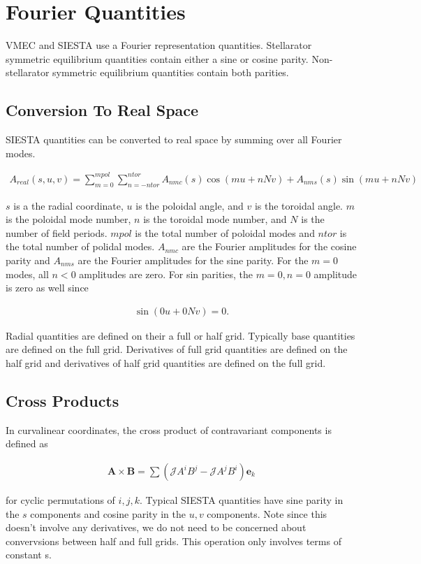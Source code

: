 \documentclass[11pt]{article}
\newcommand{\brackets}[1]{\left(#1\right)}
\renewcommand{\vec}[1]{\boldsymbol#1}
\newcommand{\co}[1]{\vec{e}_{#1}}
\newcommand{\equ}[2]{
	\begin{equation}
    \begin{split}
	#1
	\label{#2}
	\end{split}
	\end{equation}
}
\newcommand{\crossp}[2]{#1\times#2}
\begin{document}
\section{Fourier Quantities}
VMEC and SIESTA use a Fourier representation quantities.
Stellarator symmetric equilibrium quantities contain either a sine or cosine parity.
Non-stellarator symmetric equilibrium quantities contain both parities.

\subsection{Conversion To Real Space}
\label{sub:sec:real_space}
SIESTA quantities can be converted to real space by summing over all Fourier modes.
\equ{
A_{real}\brackets{s,u,v}=\sum^{mpol}_{m=0}\sum^{ntor}_{n=-ntor} A_{nmc}\brackets{s}\cos\brackets{mu+nNv} + A_{nms}\brackets{s}\sin\brackets{mu+nNv}
}{equ:fourier_to_real}
$s$ is a the radial coordinate, $u$ is the poloidal angle, and $v$ is the toroidal angle.
$m$ is the poloidal mode number, $n$ is the toroidal mode number, and $N$ is the number of field periods.
$mpol$ is the total number of poloidal modes and $ntor$ is the total number of polidal modes.
$A_{nmc}$ are the Fourier amplitudes for the cosine parity and $A_{nms}$ are the Fourier amplitudes for the sine parity.
For the $m=0$ modes, all $n<0$ amplitudes are zero.
For sin parities, the $m=0,n=0$ amplitude is zero as well since
\equ{
\sin\brackets{0u+0Nv}=0.
}{equ:fourier_sine_00}
Radial quantities are defined on their a full or half grid.
Typically base quantities are defined on the full grid.
Derivatives of full grid quantities are defined on the half grid and derivatives of half grid quantities are defined on the full grid.

\subsection{Cross Products}
In curvalinear coordinates, the cross product of contravariant components is defined as
\equ{
\crossp{\vec{A}}{\vec{B}}=\sum\brackets{\mathcal{J}A^{i}B^{j}-\mathcal{J}A^{j}B^{i}}\co{k}
}{equ:cross_con}
for cyclic permutations of $i,j,k$.
Typical SIESTA quantities have sine parity in the $s$ components and cosine parity in the $u,v$ components.
Note since this doesn't involve any derivatives, we do not need to be concerned about convervsions between half and full grids.
This operation only involves terms of constant s.
\end{document}
